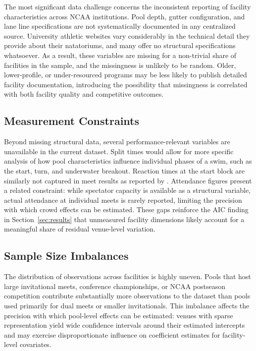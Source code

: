 \documentclass[12pt]{article}
\begin{document}
The most significant data challenge concerns the inconsistent reporting of
facility characteristics across NCAA institutions. Pool depth, gutter
configuration, and lane line specifications are not systematically documented
in any centralized source. University athletic websites vary considerably in the
technical detail they provide about their natatoriums, and many offer no
structural specifications whatsoever. As a result, these variables are missing
for a non-trivial share of facilities in the sample, and the missingness is
unlikely to be random. Older, lower-profile, or under-resourced programs may be
less likely to publish detailed facility documentation, introducing the
possibility that missingness is correlated with both facility quality and
competitive outcomes.

\subsection{Measurement Constraints}

Beyond missing structural data, several performance-relevant variables are
unavailable in the current dataset. Split times would allow for more specific
analysis of how pool characteristics influence individual phases of a swim,
such as the start, turn, and underwater breakout. Reaction times at the start
block are similarly not captured in meet results as reported by
\textcite{usaswimming2026}. Attendance figures present a related constraint:
while spectator capacity is available as a structural variable, actual
attendance at individual meets is rarely reported, limiting the precision with
which crowd effects can be estimated. These gaps reinforce the AIC finding in
Section~\ref{sec:results} that unmeasured facility dimensions likely account
for a meaningful share of residual venue-level variation.

\subsection{Sample Size Imbalances}

The distribution of observations across facilities is highly uneven. Pools that
host large invitational meets, conference championships, or NCAA postseason
competition contribute substantially more observations to the dataset than pools
used primarily for dual meets or smaller invitationals. This imbalance affects
the precision with which pool-level effects can be estimated: venues with sparse
representation yield wide confidence intervals around their estimated intercepts
and may exercise disproportionate influence on coefficient estimates for
facility-level covariates.
\end{document}
